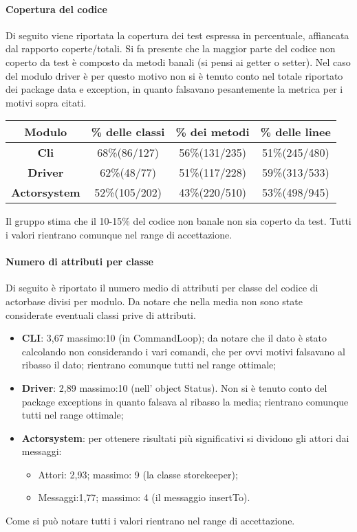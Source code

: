 \documentclass{scalatekids-article}
\begin{document}
\paragraph{Copertura del codice}
Di seguito viene riportata la copertura dei test espressa in percentuale, affiancata dal rapporto coperte/totali. Si fa presente che la maggior parte del codice non coperto da test è composto da metodi banali (si pensi ai getter o setter). Nel caso del  modulo driver è per questo motivo non si è tenuto conto nel totale riportato dei package data e exception, in quanto falsavano pesantemente la metrica per i motivi sopra citati.
\begin{center}
	\begin{tabular}{| c | c | c | c |}
		\hline
		Modulo & \% delle classi & \% dei metodi & \% delle linee \\
		\hline
		\textbf{Cli} & 68\%(86/127) & 56\%(131/235) & 51\%(245/480) \\
		\textbf{Driver} &  62\%(48/77) & 51\%(117/228) & 59\%(313/533)\\
		\textbf{Actorsystem} & 52\%(105/202) & 43\%(220/510) & 53\%(498/945)\\
		\hline
	\end{tabular}
	\end{center}
	Il gruppo stima che il 10-15\% del codice non banale non sia coperto da test. Tutti i valori rientrano comunque nel range di accettazione.
	\paragraph{Numero di attributi per classe}
	Di seguito è riportato il numero medio di attributi per classe del codice di actorbase divisi per modulo. Da notare che nella media non sono state considerate eventuali classi prive di attributi.
	\begin{itemize}
		\item \textbf{CLI}: 3,67 massimo:10 (in CommandLoop); da notare che il dato è stato calcolando non considerando i vari comandi, che per ovvi motivi falsavano al ribasso il dato; rientrano comunque tutti nel range ottimale;
		\item \textbf{Driver}: 2,89 massimo:10 (nell' object Status). Non si è tenuto conto del package exceptions in quanto falsava al ribasso la media; rientrano comunque tutti nel range ottimale;
		\item \textbf{Actorsystem}: per ottenere risultati più significativi si dividono gli attori dai messaggi:
		\begin{itemize}
			\item Attori: 2,93; massimo: 9 (la classe storekeeper);
			\item Messaggi:1,77; massimo: 4 (il messaggio insertTo).
		\end{itemize}
	\end{itemize}
	Come si può notare tutti i valori rientrano nel range di accettazione.
	
\end{document}
